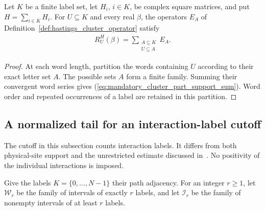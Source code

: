 \begin{lemma}
    \label{thm:mandatory_cluster_part_support_sum}
    \leanok

    Let $K$ be a finite label set, let $H_i$, $i\in K$, be complex square
    matrices, and put $H=\sum_{i\in K}H_i$. For $U\subseteq K$ and every
    real $\beta$, the operators $E_A$ of
    Definition~\ref{def:hastings_cluster_operator} satisfy
    \begin{align}
        R_U^H(\beta)=\sum_{\substack{A\subseteq K\\U\subseteq A}}E_A.
        \label{eq:mandatory_cluster_part_support_sum}
    \end{align}
\end{lemma}
\begin{proof}\leanok
    At each word length, partition the words containing $U$ according to
    their exact letter set $A$. The possible sets $A$ form a finite
    family. Summing their convergent word series gives
    (\ref{eq:mandatory_cluster_part_support_sum}). Word order and repeated
    occurrences of a label are retained in this partition.
\end{proof}


\subsection{A normalized tail for an interaction-label cutoff}

The cutoff in this subsection counts interaction labels. It differs from
both physical-site support and the unrestricted estimate discussed
in~\cite{gap:alvv16_cluster_approximation}. No positivity of the individual
interactions is imposed.

\begin{definition}
    \label{def:cluster_label_intervals}
    \leanok

    Give the labels $K=\{0,\ldots,N-1\}$ their path adjacency. For an integer
    $r\geq1$, let $\mathcal W_r$ be the family of intervals of exactly $r$
    labels, and let $\mathcal I_r$ be the family of nonempty intervals of
    at least $r$ labels.
\end{definition}

